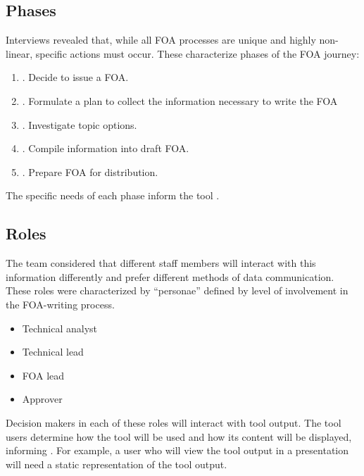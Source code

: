 \documentclass[letterpaper,10pt,english]{sphinxmanual}
\begin{document}
\subsection{Phases}
\label{\detokenize{mock-foa:phases}}
Interviews revealed that, while all FOA processes are unique and highly
non-linear, specific actions must occur. These characterize phases of
the FOA journey:
\begin{enumerate}
\def\theenumi{\arabic{enumi}}
\def\labelenumi{\theenumi .}
\makeatletter\def\p@enumii{\p@enumi \theenumi .}\makeatother
\item {} 
. Decide to issue a FOA.

\item {} 
. Formulate a plan to collect the information necessary to write the FOA

\item {} 
. Investigate topic options.

\item {} 
. Compile information into draft FOA.

\item {} 
. Prepare FOA for distribution.

\end{enumerate}

The specific needs of each phase inform the tool .


\subsection{Roles}
\label{\detokenize{mock-foa:roles}}
The team considered that different staff members will interact with this
information differently and prefer different methods of data
communication. These roles were characterized by “personae” defined by
level of involvement in the FOA-writing process.
\begin{itemize}
\item {} 
Technical analyst

\item {} 
Technical lead

\item {} 
FOA lead

\item {} 
Approver

\end{itemize}

Decision makers in each of these roles will interact with tool output.
The tool users determine how the tool will be used and how its content
will be displayed, informing .
For example, a user who will view the tool output in a presentation will
need a static representation of the tool output.
\end{document}
